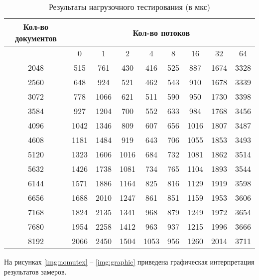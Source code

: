 \begin{table}[h]
	\begin{center}
		\begin{threeparttable}
			\caption{Результаты нагрузочного тестирования (в мкс)}
			\label{tbl:threads}
			\begin{tabular}{|c|c|c|c|c|c|c|c|c|}
				\hline
				{Кол-во документов} & \multicolumn{8}{c}{Кол-во потоков} \\
				\hline
				 & 0 & 1 & 2 & 4 & 8 & 16 & 32 & 64 \\
				\hline
				2048 & 515 & 761 & 430 & 416 & 525 & 887 & 1674 & 3328 \\
				\hline
				2560 & 648 & 924 & 521 & 462 & 543 & 910 & 1678 & 3339 \\
				\hline
				3072 & 778 & 1066 & 621 & 511 & 590 & 950 & 1730 & 3398 \\
				\hline
				3584 & 927 & 1204 & 700 & 552 & 633 & 984 & 1768 & 3456 \\
				\hline
				4096 & 1042 & 1346 & 809 & 607 & 656 & 1016 & 1807 & 3487 \\
				\hline
				4608 & 1181 & 1484 & 919 & 643 & 706 & 1055 & 1853 & 3493 \\
				\hline
				5120 & 1323 & 1606 & 1016 & 684 & 732 & 1081 & 1862 & 3514 \\
				\hline
				5632 & 1426 & 1738 & 1081 & 734 & 765 & 1104 & 1893 & 3544 \\
				\hline
				6144 & 1571 & 1886 & 1164 & 825 & 816 & 1129 & 1919 & 3598 \\
				\hline
				6656 & 1688 & 2010 & 1247 & 861 & 851 & 1159 & 1953 & 3606 \\
				\hline
				7168 & 1824 & 2135 & 1341 & 968 & 879 & 1249 & 1972 & 3654 \\
				\hline
				7680 & 1954 & 2258 & 1412 & 963 & 937 & 1215 & 1996 & 3666 \\
				\hline
				8192 & 2066 & 2450 & 1504 & 1053 & 956 & 1260 & 2014 & 3711 \\
				\hline
				
			\end{tabular}
		\end{threeparttable}
	\end{center}
\end{table}

На рисунках \ref{img:nomutex} -- \ref{img:graphic} приведена графическая интерпретация результатов замеров.


